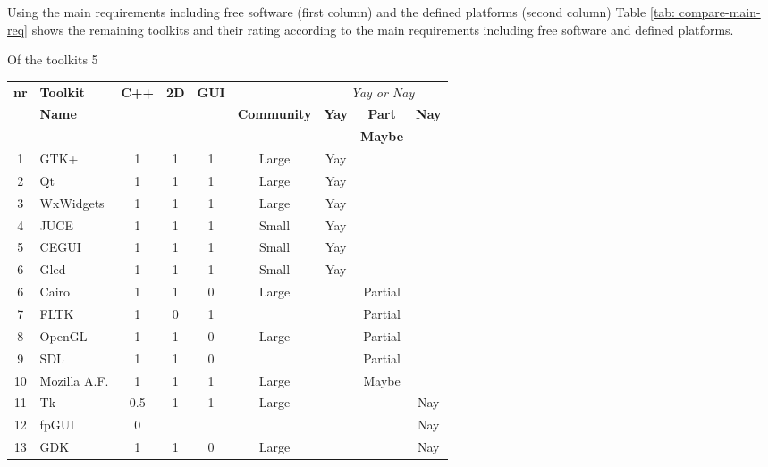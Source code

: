 Using the main requirements including free software (first column) and the defined platforms (second column)
Table \ref{tab: compare-main-req} shows the remaining toolkits and their rating according to the 
main requirements including free software and defined platforms.

Of the toolkits 5 

\begin{center}
    \small\sf
    \begin{tabular}{c|lccc|c|ccc}
	\hline
	{\bf nr} & {\bf Toolkit} & {\bf C++} & {\bf 2D} & {\bf GUI}  &                 & \multicolumn{3}{c}{\em Yay or Nay} \\
	         & {\bf Name}    & 			 &          &            & {\bf Community} & {\bf Yay} & {\bf Part} & {\bf Nay} \\
	         &			     &         	 &          &            &         		   &           & {\bf Maybe}  &         \\
        \hline
1  &	    GTK+	  	& 1   & 1 & 1 &  Large  & Yay &         &     \\
2  &	    Qt	      	& 1   & 1 & 1 &  Large  & Yay &         &     \\
3  &	    WxWidgets 	& 1   & 1 & 1 &  Large  & Yay &         &     \\
4  &	    JUCE      	& 1   & 1 & 1 &  Small  & Yay &         &     \\
5  &	    CEGUI     	& 1   & 1 & 1 &  Small  & Yay &         &     \\
6  &        Gled        & 1   & 1 & 1 &  Small  & Yay &         &     \\
																\hline
6  &		Cairo     	& 1   & 1 & 0 &  Large  &     & Partial &     \\
7  &		FLTK      	& 1   & 0 & 1 &         &     & Partial &     \\
8  & 	    OpenGL 	  	& 1   & 1 & 0 &  Large  &     & Partial &     \\
9  &	SDL				& 1   & 1 & 0 &         &     & Partial &     \\\hline
10 &	Mozilla A.F.  	& 1   & 1 & 1 &  Large  &     & Maybe   &     \\\hline
11 &	Tk	          	& 0.5 & 1 & 1 &  Large  &     &         & Nay \\
12 &	fpGUI     	  	& 0   &   &   &         &     &         & Nay \\
13 &	GDK       		& 1   & 1 & 0 &  Large  &     &         & Nay \\
	\hline
    \end{tabular}
	\label{tab: compare-main-req}
\end{center}

